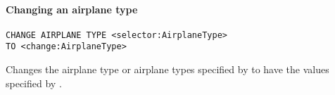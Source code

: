 \paragraph{Changing an airplane type}
\begin{operation}
  \begin{lstlisting}
CHANGE AIRPLANE TYPE <selector:AirplaneType>
TO <change:AirplaneType>
  \end{lstlisting}
\end{operation}
Changes the airplane type or airplane types specified by  to have
the values specified by .

%

